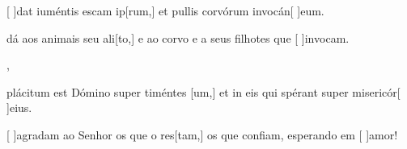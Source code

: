 {  {\item {}[ ]{dat} iuméntis escam ip[rum,] et pullis corvórum invocán[ ]{e}um.~\Antiphona}%
    {\item {} dá aos animais seu ali[to,] e ao corvo e a seus filhotes que [ ]{in}{vo}cam.~\Antiphona},
  {\item {}plácitum est Dómino super timéntes [um,] et in eis qui spérant super misericór[ ]{e}ius.~\Antiphona}%
    {\item {}[ ]{a}gradam ao Senhor os que o res[tam,] os que confiam, esperando em [ ]{a}{mor}!~\Antiphona}
}